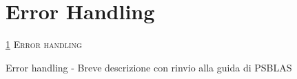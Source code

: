 \section{Error Handling}\label{sec:errors}
         {\textsc{\ref{sec:errors} Error handling}}

Error handling
    - Breve descrizione con rinvio alla guida di PSBLAS

